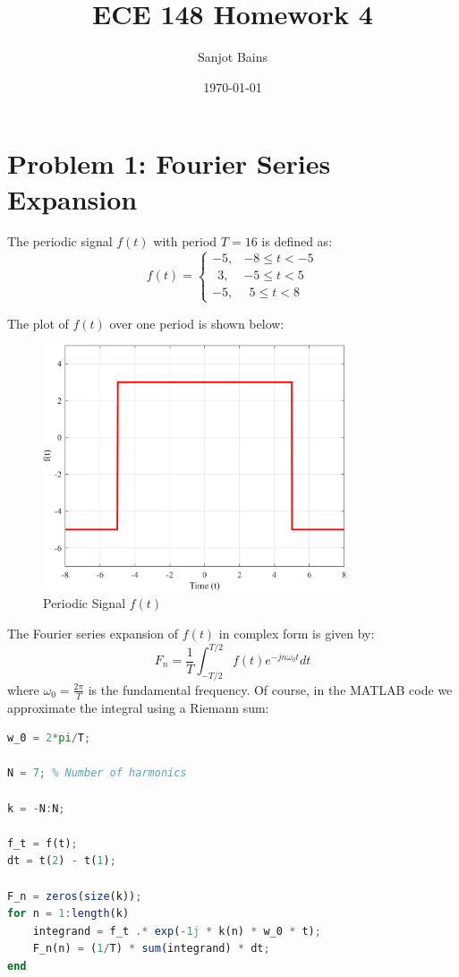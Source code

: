 \documentclass[12pt]{article}
\title{ECE 148 Homework 4}
\author{Sanjot Bains}
\date{\today}
\begin{document}
\maketitle

\section*{Problem 1: Fourier Series Expansion}
The periodic signal $f(t)$ with period $T = 16$ is defined as:
\[ f(t) = \begin{cases} 
    -5, & -8 \leq t < -5 \\
    \ \ 3, & -5 \leq t < 5 \\
    -5, & \ \ 5 \leq t < 8
\end{cases} \]

\vspace{1cm}
The plot of $f(t)$ over one period is shown below:
\begin{figure}[H]
    \centering
    \includegraphics[width=0.8\textwidth]{f_t.png}
    \caption{Periodic Signal $f(t)$}
\end{figure}

The Fourier series expansion of $f(t)$ in complex form is given by:
\[ F_n = \frac{1}{T} \int_{-T/2}^{T/2} f(t) e^{-j n \omega_0 t} dt \]
where $\omega_0 = \frac{2\pi}{T}$ is the fundamental frequency.
Of course, in the MATLAB code we approximate the integral using a Riemann sum:
\vspace{0.25cm}
\begin{lstlisting}[language=Octave, caption=MATLAB Script to Compute Fourier Series coefficients]
w_0 = 2*pi/T;

N = 7; % Number of harmonics

k = -N:N;   

f_t = f(t);
dt = t(2) - t(1);

F_n = zeros(size(k));   
for n = 1:length(k)
    integrand = f_t .* exp(-1j * k(n) * w_0 * t);
    F_n(n) = (1/T) * sum(integrand) * dt; 
end
\end{lstlisting}
\end{document}
